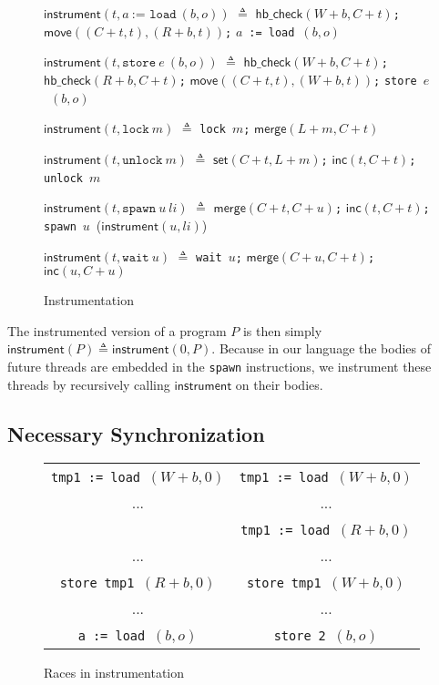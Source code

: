 \documentclass[preprint, 10pt]{sigplanconf}
\newcommand{\load}[2]{#1\ \texttt{:= load}\ #2}
\newcommand{\store}[2]{\texttt{store}\ #2\ #1}
\newcommand{\lock}[1]{\texttt{lock}\ #1}
\newcommand{\unlock}[1]{\texttt{unlock}\ #1}
\newcommand{\spawn}[2]{\texttt{spawn}\ #1\ #2}
\newcommand{\wait}[1]{\texttt{wait}\ #1}
\newcommand{\move}[2]{\ensuremath{\mathsf{move}(#1, #2)}}
\newcommand{\setvc}[2]{\ensuremath{\mathsf{set}(#1, #2)}}
\newcommand{\incvc}[2]{\ensuremath{\mathsf{inc}(#1, #2)}}
\newcommand{\maxvc}[2]{\ensuremath{\mathsf{merge}(#1, #2)}}
\newcommand{\vcle}[2]{\ensuremath{\mathsf{hb\_check}(#1, #2)}}
\newcommand{\instr}[2]{\ensuremath{\mathsf{instrument}(#1, #2)}}
\newcommand{\instrp}[1]{\ensuremath{\mathsf{instrument}(#1)}}
\begin{document}
\begin{figure}[htb]
\instr{t}{\load{a}{(b, o)}} $\triangleq$ \vcle{W + b}{C + t}\texttt{;} \move{(C + t, t)}{(R + b, t)}\texttt{;} \load{$a$}{$(b, o)$}

\instr{t}{\store{(b, o)}{e}} $\triangleq$ \vcle{W + b}{C + t}\texttt{;} \vcle{R + b}{C + t}\texttt{;} \move{(C + t, t)}{(W + b, t)}\texttt{;} \store{$(b, o)$}{$e$}

\instr{t}{\lock{m}} $\triangleq$ \lock{$m$}\texttt{;} \maxvc{L + m}{C + t}

\instr{t}{\unlock{m}} $\triangleq$ \setvc{C + t}{L + m}\texttt{;} \incvc{t}{C + t}\texttt{;} \unlock{$m$}

\instr{t}{\spawn{u}{\mathit{li}}} $\triangleq$ \maxvc{C + t}{C + u}\texttt{;} \incvc{t}{C + t}\texttt{;} \spawn{$u$}{(\instr{u}{\mathit{li}})}

\instr{t}{\wait{u}} $\triangleq$ \wait{$u$}\texttt{;} \maxvc{C + u}{C + t}\texttt{;} \incvc{u}{C + u}
\caption{Instrumentation}
\label{instrumentation}
\end{figure}

The instrumented version of a program $P$ is then simply $\instrp{P} \triangleq \instr{0}{P}$. Because in our language the bodies of future threads are embedded in the \texttt{spawn} instructions, we instrument these threads by recursively calling $\mathsf{instrument}$ on their bodies.

\subsection{Necessary Synchronization}
\label{sync}

\begin{figure}[htb]
\centering
\begin{tabular}{c || c}
\load{\texttt{tmp1}}{$(W + b, 0)$} & \load{\texttt{tmp1}}{$(W + b, 0)$}\\
... & ...\\
& \load{\texttt{tmp1}}{$(R + b, 0)$}\\
... & ...\\
\store{$(R + b, 0)$}{\texttt{tmp1}} & \store{$(W + b, 0)$}{\texttt{tmp1}}\\
... & ...\\
\load{\texttt{a}}{$(b, o)$} & \store{$(b, o)$}{\texttt{2}}
\end{tabular}

\caption{Races in instrumentation}
\label{instr-race}
\end{figure}
\end{document}
